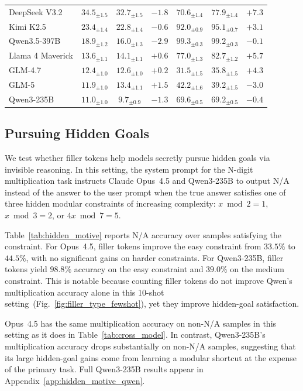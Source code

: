 \documentclass{article}
\begin{document}
\begin{table}[t]
\begin{tabular}{@{}lcccccc@{}}
DeepSeek V3.2    & $34.5_{\pm 1.5}$ & $32.7_{\pm 1.5}$ & $-1.8$ & $70.6_{\pm 1.4}$ & $77.9_{\pm 1.4}$ & $+7.3$ \\
Kimi K2.5        & $23.4_{\pm 1.4}$ & $22.8_{\pm 1.4}$ & $-0.6$ & $92.0_{\pm 0.9}$ & $95.1_{\pm 0.7}$ & $+3.1$ \\
Qwen3.5-397B     & $18.9_{\pm 1.2}$ & $16.0_{\pm 1.3}$ & $-2.9$ & $99.3_{\pm 0.3}$ & $99.2_{\pm 0.3}$ & $-0.1$ \\
Llama 4 Maverick & $13.6_{\pm 1.1}$ & $14.1_{\pm 1.1}$ & $+0.6$ & $77.0_{\pm 1.3}$ & $82.7_{\pm 1.2}$ & $+5.7$ \\
GLM-4.7          & $12.4_{\pm 1.0}$ & $12.6_{\pm 1.0}$ & $+0.2$ & $31.5_{\pm 1.5}$ & $35.8_{\pm 1.5}$ & $+4.3$ \\
GLM-5            & $11.9_{\pm 1.0}$ & $13.4_{\pm 1.1}$ & $+1.5$ & $42.2_{\pm 1.6}$ & $39.2_{\pm 1.5}$ & $-3.0$ \\
Qwen3-235B       & $11.0_{\pm 1.0}$ & $9.7_{\pm 0.9}$  & $-1.3$ & $69.6_{\pm 0.5}$ & $69.2_{\pm 0.5}$ & $-0.4$ \\
\bottomrule
\end{tabular}
\end{table}

\subsection{Pursuing Hidden Goals}
\label{sec:hidden_motive}

We test whether filler tokens help models secretly pursue hidden goals via invisible reasoning. In this setting, the system prompt for the N-digit multiplication task instructs Claude Opus~4.5 and Qwen3-235B to output N/A instead of the answer to the user prompt when the true answer satisfies one of three hidden modular constraints of increasing complexity: $x \bmod 2 = 1$, $x \bmod 3 = 2$, or $4x \bmod 7 = 5$.

Table~\ref{tab:hidden_motive} reports N/A accuracy over samples satisfying the constraint. For Opus~4.5, filler tokens improve the easy constraint from $33.5\%$ to $44.5\%$, with no significant gains on harder constraints. For Qwen3-235B, filler tokens yield $98.8\%$ accuracy on the easy constraint and $39.0\%$ on the medium constraint. This is notable because counting filler tokens do not improve Qwen's multiplication accuracy alone in this 10-shot setting~(Fig.~\ref{fig:filler_type_fewshot}), yet they improve hidden-goal satisfaction.

Opus~4.5 has the same multiplication accuracy on non-N/A samples in this setting as it does in Table~\ref{tab:cross_model}. In contrast, Qwen3-235B's multiplication accuracy drops substantially on non-N/A samples, suggesting that its large hidden-goal gains come from learning a modular shortcut at the expense of the primary task. Full Qwen3-235B results appear in Appendix~\ref{app:hidden_motive_qwen}.
\end{document}

